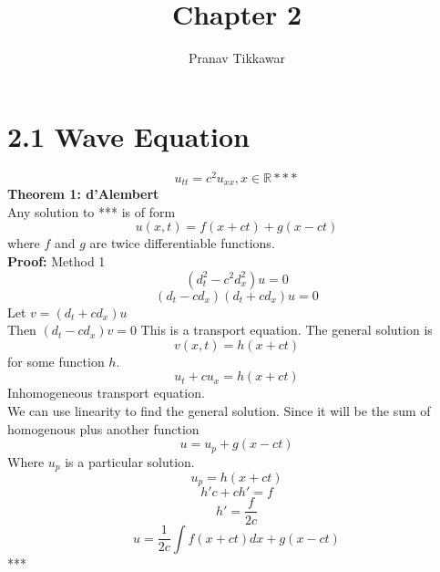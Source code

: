 \documentclass{article}
\author{Pranav Tikkawar}
\title{Chapter 2 }
\begin{document}
\maketitle
\section*{2.1 Wave Equation}
$$ u_{tt} = c^2 u_{xx}, x \in \mathds{R} ***$$
\textbf{Theorem 1: d'Alembert}\\
Any solution to *** is of form $$ u(x,t) = f(x + ct) + g(x - ct) $$  where $f$ and $g$ are twice differentiable functions.\\
\textbf{Proof:} Method 1\\
$$ (d_t^2 - c^2 d_x^2 )u  = 0 $$
$$ (d_t - c d_x)(d_t + c d_x)u = 0 $$
Let $ v = (d_t + c d_x)u $\\
Then $ (d_t - c d_x)v = 0 $
This is a transport equation. The general solution is $$ v(x,t) = h(x + ct) $$ for some function $h$.\\
$$ u_t + c u_x  = h(x + ct) $$
Inhomogeneous transport equation.\\
We can use linearity to find the general solution. Since it will be the sum of homogenous plus another function\\
$$ u = u_p + g(x-ct) $$
Where $u_p$ is a particular solution.\\
$$ u_p = h(x + ct) $$
$$h'c + ch' =  f$$ 
$$h' = \frac{f}{2c}$$
$$ u = \frac{1}{2c} \int f(x + ct) dx + g(x - ct)$$***
\end{document}
